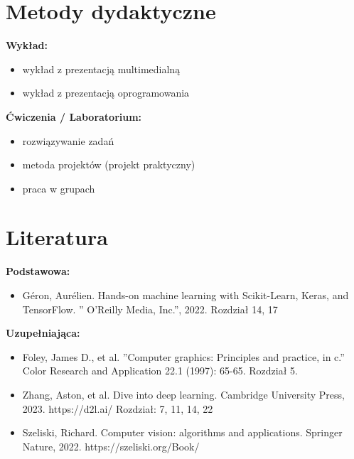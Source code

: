 \documentclass[12pt, a4paper]{article}
\begin{document}
\section{Metody dydaktyczne}

\textbf{Wykład:}
\begin{itemize}
  \item wykład z prezentacją multimedialną
  \item wykład z prezentacją oprogramowania
\end{itemize}
\vspace{4pt}
\textbf{Ćwiczenia / Laboratorium:}
\begin{itemize}
  \item rozwiązywanie zadań
  \item metoda projektów (projekt praktyczny)
  \item praca w grupach
\end{itemize}
\vspace{4pt}


\section{Literatura}

\textbf{Podstawowa:}
\begin{itemize}
  \item Géron, Aurélien. Hands-on machine learning with Scikit-Learn, Keras, and TensorFlow. '' O'Reilly Media, Inc.'', 2022.  Rozdział 14, 17
\end{itemize}

\textbf{Uzupełniająca:}
\begin{itemize}
  \item Foley, James D., et al. ''Computer graphics: Principles and practice, in c.'' Color Research and Application 22.1 (1997): 65-65. Rozdział 5.
  \item Zhang, Aston, et al. Dive into deep learning. Cambridge University Press, 2023. https://d2l.ai/ Rozdział: 7, 11, 14, 22
  \item Szeliski, Richard. Computer vision: algorithms and applications. Springer Nature, 2022. https://szeliski.org/Book/
\end{itemize}
\end{document}
